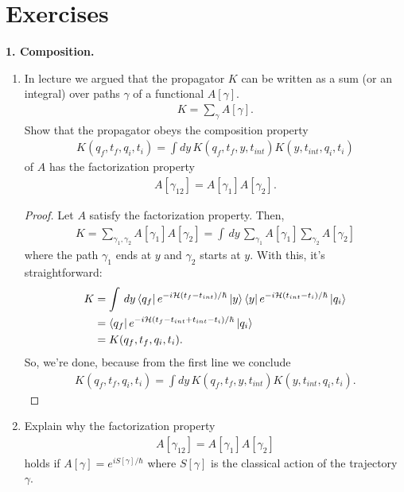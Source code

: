 \documentclass{book}
\theoremstyle{definition}
\newcommand{\nn}{\nonumber}
\newcommand{\had}{\mathcal{H}}
\begin{document}
\newpage




\section{Exercises}



\noindent \textbf{1. Composition.} 
\begin{enumerate}
	\item In lecture we argued that the propagator $K$ can be written as a sum (or an integral) over paths $\gamma$ of a functional $A[\gamma]$. 
	\begin{align}
	K = \sum_\gamma A[\gamma].
	\end{align}
	Show that the propagator obeys the composition property
	\begin{align}
	K(q_f, t_f, q_i, t_i) = \int dy\, K(q_f,t_f,y,t_{int})K(y,t_{int},q_i ,t_i)
	\end{align}
	of $A$ has the factorization property
	\begin{align}
	A[\gamma_{12}] = A[\gamma_1]A[\gamma_2].
	\end{align}
	
	
	
	\begin{proof}
		Let $A$ satisfy the factorization property. Then, 
		\begin{align}
		K = \sum_{\gamma_1,\gamma_2}A[\gamma_1]A[\gamma_2] = \int \,dy \,\sum_{\gamma_1} A[\gamma_1] \sum_{\gamma_2} A[\gamma_2]
		\end{align}
		where the path $\gamma_1$ ends at $y$ and $\gamma_2$ starts at $y$. With this, it's straightforward:
		\begin{align}
		K &= \int \,dy \bra{q_f}e^{-i\had (t_f - t_{int})/\hbar}\ket{y}\bra{y} e^{-i \had (t_{int} - t_i)/\hbar} \ket{q_i}\nn\\
		&= \bra{q_f}e^{-i\had(t_f - t_{int} + t_{int} - t_i)/\hbar}\ket{q_i}   \nn\\
		&= K(q_f,t_f,q_i,t_i).
		\end{align}
		So, we're done, because from the first line we conclude
		\begin{align}
		K(q_f, t_f, q_i, t_i) = \int dy\, K(q_f,t_f,y,t_{int})K(y,t_{int},q_i ,t_i).
		\end{align}
	\end{proof}
	
	
	
	
	\item Explain why the factorization property
	\begin{align}
	A[\gamma_{12}] = A[\gamma_1]A[\gamma_2]
	\end{align}
	holds if $A[\gamma] = e^{iS[\gamma]/\hbar}$ where $S[\gamma]$ is the classical action of the trajectory $\gamma$.
	

\end{enumerate}
\end{document}

